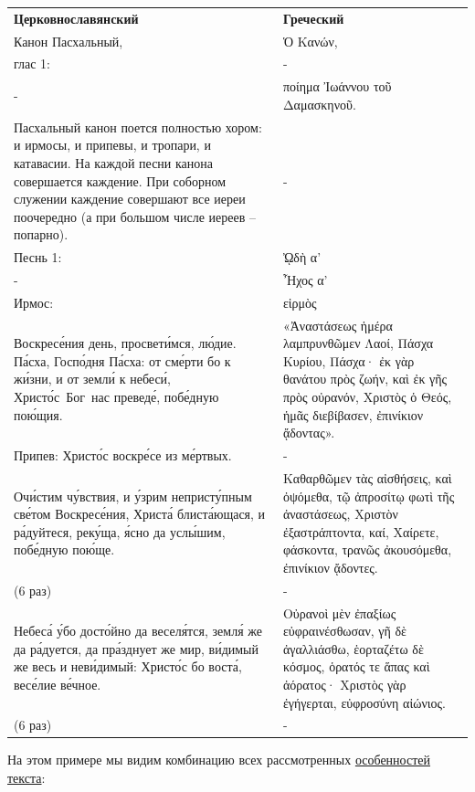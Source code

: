 \documentclass[
  letterpaper,
]{book}
\begin{document}
\begin{longtable}[]{@{}
  >{\raggedright\arraybackslash}p{}
  >{\raggedright\arraybackslash}p{}@{}}
\toprule\noalign{}
\endhead
\bottomrule\noalign{}
\endlastfoot
\textbf{Церковнославянский} & \textbf{Греческий} \\
Канон Пасхальный, & Ὁ Κανών, \\
глас 1: & - \\
- & ποίημα Ἰωάννου τοῦ Δαμασκηνοῦ. \\
Пасхальный канон поется полностью хором: и ирмосы, и припевы, и тропари,
и катавасии. На каждой песни канона совершается каждение. При соборном
служении каждение совершают все иереи поочередно (а при большом числе
иереев -- попарно). & - \\
Песнь 1: & ᾨδὴ α' \\
- & Ἦχος α' \\
Ирмос: & εἱρμὸς \\
Воскресе́ния день, просвети́мся, лю́дие. Па́сха, Госпо́дня Па́сха: от сме́рти
бо к жи́зни, и от земли́ к небеси́, Христо́с~Бог~нас преведе́, побе́дную
пою́щия. & «Ἀναστάσεως ἡμέρα λαμπρυνθῶμεν Λαοί, Πάσχα Κυρίου, Πάσχα· ἐκ
γὰρ θανάτου πρὸς ζωήν, καὶ ἐκ γῆς πρὸς οὐρανόν, Χριστὸς ὁ Θεός, ἡμᾶς
διεβίβασεν, ἐπινίκιον ᾄδοντας». \\
Припев: Христо́с воскре́се из ме́ртвых. & - \\
Очи́стим чу́вствия, и у́зрим непристу́пным све́том Воскресе́ния, Христа́
блиста́ющася, и ра́дуйтеся, реку́ща, я́сно да услы́шим, побе́дную пою́ще. &
Καθαρθῶμεν τὰς αἰσθήσεις, καὶ ὀψόμεθα, τῷ ἀπροσίτῳ φωτὶ τῆς ἀναστάσεως,
Χριστὸν ἐξαστράπτοντα, καί, Χαίρετε, φάσκοντα, τρανῶς ἀκουσόμεθα,
ἐπινίκιον ᾄδοντες. \\
(6 раз) & - \\
Небеса́ у́бо досто́йно да веселя́тся, земля́ же да ра́дуется, да пра́зднует же
мир, ви́димый же весь и неви́димый: Христо́с бо воста́, весе́лие ве́чное. &
Οὐρανοὶ μὲν ἐπαξίως εὐφραινέσθωσαν, γῆ δὲ ἀγαλλιάσθω, ἑορταζέτω δὲ
κόσμος, ὁρατός τε ἅπας καὶ ἀόρατος· Χριστὸς γὰρ ἐγήγερται, εὐφροσύνη
αἰώνιος. \\
(6 раз) & - \\
\end{longtable}

На этом примере мы видим комбинацию всех рассмотренных
\protect\hyperlink{sec-about_pent_specifics}{особенностей текста}:
\end{document}
